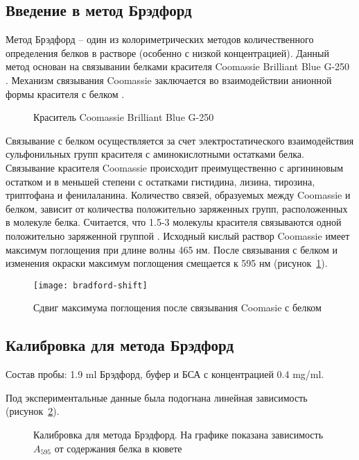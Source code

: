 \subsection{Введение в метод Брэдфорд}
Метод Брэдфорд -- один из колориметрических методов количественного определения белков в растворе
(особенно с низкой концентрацией).
Данный метод основан на связывании белками красителя Coomassie Brilliant Blue G-250 \cite{bradford-1}.
Механизм связывания Coomassie заключается во взаимодействии анионной формы красителя с белком \cite{bradford-2}.

\begin{figure}[htbp]
\def\svgwidth{0.7\linewidth}
\caption{Краситель Coomassie Brilliant Blue G-250}
\end{figure}

Связывание с белком осуществляется за счет электростатического взаимодействия сульфонильных групп
красителя с аминокислотными остатками белка.
Связывание красителя Coomassie происходит преимущественно с аргининовым остатком и в меньшей степени с
остатками гистидина, лизина, тирозина, триптофана и фенилаланина.
Количество связей, образуемых между Coomassie и белком, зависит от количества положительно заряженных групп,
расположенных в молекуле белка.
Считается, что 1.5-3 молекулы красителя связываются одной положительно заряженной группой \cite{bradford-3}.
Исходный кислый раствор Coomassie имеет максимум поглощения при длине волны 465 нм.
После связывания с белком и изменения окраски максимум поглощения смещается к 595 нм
(рисунок~\ref{fig-shift}).

\begin{figure}[htbp]
\texttt{[image: bradford-shift]}
\caption{Сдвиг максимума поглощения после связывания Coomasie с белком}
\label{fig-shift}
\end{figure}

\subsection{Калибровка для метода Брэдфорд}
\label{A0k}

Состав пробы: 1.9 ml Брэдфорд, буфер и БСА с концентрацией 0.4 mg/ml.

Под экспериментальные данные была подогнана линейная зависимость
(рисунок~\ref{fig-calibration}).

\begin{figure}[htbp]

\caption{Калибровка для метода Брэдфорд.
    На графике показана зависимость $A_{595}$ от содержания белка в кювете}
\label{fig-calibration}
\end{figure}

